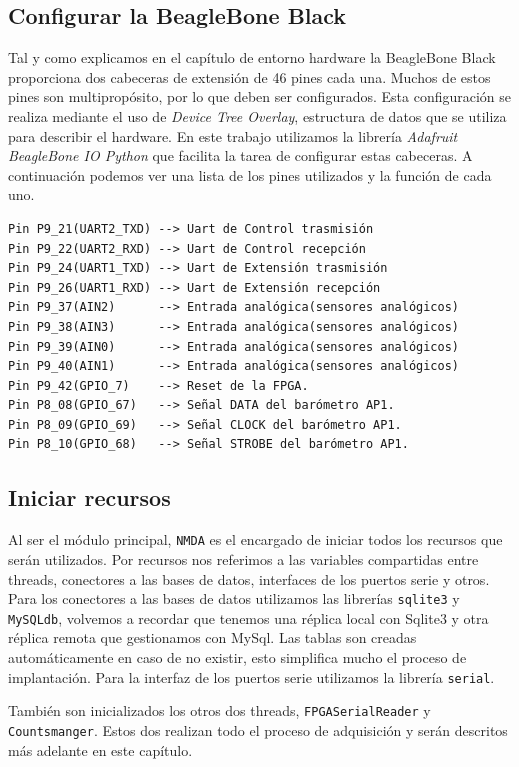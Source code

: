 	\subsection{Configurar la BeagleBone Black}
		Tal y como explicamos en el capítulo de entorno hardware la BeagleBone Black proporciona dos cabeceras de extensión de 46 pines cada
		una\cite{BeagleWikiExp}. Muchos de estos pines son multipropósito, por lo que deben ser configurados. Esta configuración se realiza
		mediante el uso de \emph{Device Tree Overlay}, estructura de datos que se utiliza para describir el hardware. En este trabajo
		utilizamos la librería \emph{Adafruit BeagleBone IO Python}\cite{AdaFruitGit} que facilita la tarea de configurar estas cabeceras. A
		continuación podemos ver una lista de los pines utilizados y la función de cada uno.
		\begin{lstlisting}[style=myBash]
Pin P9_21(UART2_TXD) --> Uart de Control trasmisión
Pin P9_22(UART2_RXD) --> Uart de Control recepción
Pin P9_24(UART1_TXD) --> Uart de Extensión trasmisión
Pin P9_26(UART1_RXD) --> Uart de Extensión recepción
Pin P9_37(AIN2)	     --> Entrada analógica(sensores analógicos)
Pin P9_38(AIN3)	     --> Entrada analógica(sensores analógicos)
Pin P9_39(AIN0)	     --> Entrada analógica(sensores analógicos)
Pin P9_40(AIN1)	     --> Entrada analógica(sensores analógicos)
Pin P9_42(GPIO_7)    --> Reset de la FPGA.
Pin P8_08(GPIO_67)   --> Señal DATA del barómetro AP1.
Pin P8_09(GPIO_69)   --> Señal CLOCK del barómetro AP1.
Pin P8_10(GPIO_68)   --> Señal STROBE del barómetro AP1.
		\end{lstlisting}

	\subsection{Iniciar recursos}
		Al ser el módulo principal, \texttt{NMDA} es el encargado de iniciar todos los recursos que serán utilizados. Por recursos nos
		referimos a las variables compartidas entre threads, conectores a las bases de datos, interfaces de los puertos serie y otros. Para
		los conectores a las bases de datos utilizamos las librerías \texttt{sqlite3} y \texttt{MySQLdb}, volvemos a recordar que tenemos una
		réplica local con Sqlite3 y otra réplica remota que gestionamos con MySql. Las tablas son creadas automáticamente en caso de no
		existir, esto simplifica mucho el proceso de implantación. Para la interfaz de los puertos serie utilizamos la librería
		\texttt{serial}.
		\par
		También son inicializados los otros dos threads, \texttt{FPGASerialReader} y \texttt{Countsmanger}. Estos dos realizan todo el proceso
		de adquisición y serán descritos más adelante en este capítulo. 
